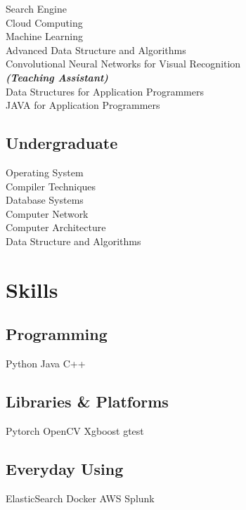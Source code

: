 \documentclass[letterpaper]{deedy-resume} %
\begin{document}
\begin{minipage}[t]{0.33\textwidth}
Search Engine \\
Cloud Computing \\
Machine Learning \\
Advanced Data Structure and Algorithms \\
Convolutional Neural Networks for Visual Recognition \\

{\footnotesize \textit{\textbf{(Teaching Assistant) }}} \\
Data Structures for Application Programmers \\
JAVA for Application Programmers

\sectionspace %


\subsection{Undergraduate}

Operating System \\
Compiler Techniques \\
Database Systems \\
Computer Network \\
Computer Architecture \\
Data Structure and Algorithms \\

\sectionspace %


\section{Skills}

\subsection{Programming}
Python \textbullet{} Java \textbullet{} C++
\sectionspace
\subsection{Libraries \& Platforms}
\textbullet{} Pytorch \textbullet{} OpenCV \textbullet{} Xgboost \textbullet{} gtest
\sectionspace
\subsection{Everyday Using}
ElasticSearch \textbullet{} Docker \textbullet{} AWS \textbullet{} Splunk

\sectionspace %


\end{minipage} %
\end{document}
